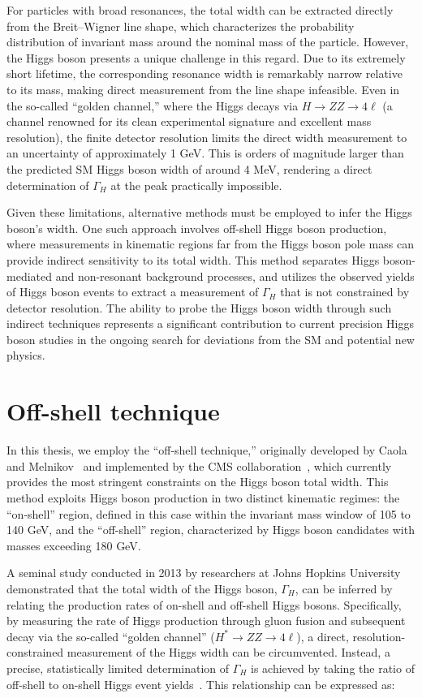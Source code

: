 For particles with broad resonances, the total width can be extracted directly from the Breit–Wigner line shape, which characterizes the probability distribution of invariant mass around the nominal mass of the particle. However, the Higgs boson presents a unique challenge in this regard. Due to its extremely short lifetime, the corresponding resonance width is remarkably narrow relative to its mass, making direct measurement from the line shape infeasible. Even in the so-called ``golden channel,'' where the Higgs decays via \( H \to ZZ \to 4\ell \) (a channel renowned for its clean experimental signature and excellent mass resolution), the finite detector resolution limits the direct width measurement to an uncertainty of approximately 1 GeV. This is orders of magnitude larger than the predicted SM Higgs boson width of around 4 MeV, rendering a direct determination of \( \Gamma_H \) at the peak practically impossible.

Given these limitations, alternative methods must be employed to infer the Higgs boson's width. One such approach involves off-shell Higgs boson production, where measurements in kinematic regions far from the Higgs boson pole mass can provide indirect sensitivity to its total width. This method separates Higgs boson-mediated and non-resonant background processes, and utilizes the observed yields of Higgs boson events to extract a measurement of \( \Gamma_H \) that is not constrained by detector resolution. The ability to probe the Higgs boson width through such indirect techniques represents a significant contribution to current precision Higgs boson studies in the ongoing search for deviations from the SM and potential new physics.

\section{Off-shell technique}

In this thesis, we employ the ``off-shell technique,'' originally developed by Caola and Melnikov~\cite{13074935} and implemented by the CMS collaboration~\cite{1405345570}, which currently provides the most stringent constraints on the Higgs boson total width. This method exploits Higgs boson production in two distinct kinematic regimes: the ``on-shell'' region, defined in this case within the invariant mass window of 105 to 140 GeV, and the ``off-shell'' region, characterized by Higgs boson candidates with masses exceeding 180 GeV.

A seminal study conducted in 2013 by researchers at Johns Hopkins University~\cite{13074935} demonstrated that the total width of the Higgs boson, \( \Gamma_H \), can be inferred by relating the production rates of on-shell and off-shell Higgs bosons. Specifically, by measuring the rate of Higgs production through gluon fusion and subsequent decay via the so-called ``golden channel'' (\( H^* \to ZZ \to 4\ell \)), a direct, resolution-constrained measurement of the Higgs width can be circumvented. Instead, a precise, statistically limited determination of \( \Gamma_H \) is achieved by taking the ratio of off-shell to on-shell Higgs event yields~\cite{190100174}. This relationship can be expressed as:

